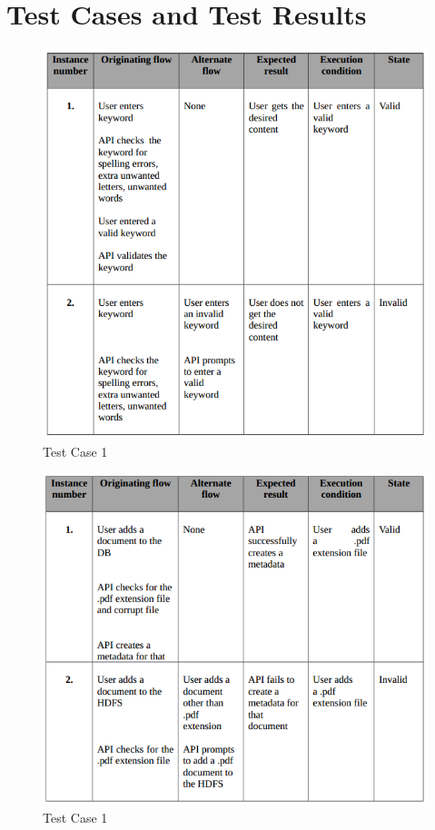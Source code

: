 \documentclass[oneside,a4paper,12pt]{report}
\begin{document}
{\section{Test Cases and Test Results}
\begin{figure}[h]
\includegraphics{test-case-1}
\caption{Test Case 1}
\end{figure}

\begin{figure}[h]
\includegraphics{test-case-2}
\caption{Test Case 1}
\end{figure}

}
\end{document}
